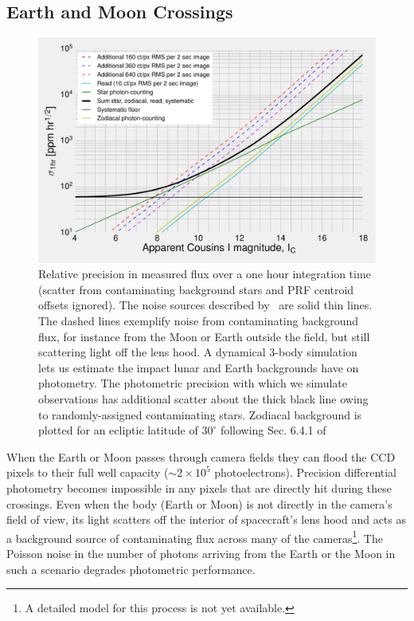 \subsection{Earth and Moon Crossings}
\label{sec:earth_moon_crossings}
\begin{figure}[!tb]
	\centering
	\includegraphics{figures/precision_memo.pdf}
	\caption{Relative precision in measured flux over a one hour integration time (scatter from contaminating background stars and PRF centroid offsets ignored). The noise sources described by~\protect\citet{Sullivan_2015} are solid thin lines. The dashed lines exemplify noise from contaminating background flux, for instance from the Moon or Earth outside the \tess field, but still scattering light off  the \tess lens hood. A dynamical 3-body simulation lets us estimate the impact  lunar and Earth backgrounds have on \tesss photometry.
	The photometric precision with which we simulate observations has additional scatter about the thick black line owing to randomly-assigned contaminating stars.
	Zodiacal background is plotted for an ecliptic latitude of $30^\circ$ following Sec. 6.4.1 of~\protect\citet{Sullivan_2015}}
	\label{fig:noise_with_moon}
\end{figure}

When the Earth or Moon passes through \tesss camera fields they can
flood the CCD pixels to their full well capacity ($\sim2\times10^5$
photoelectrons).  Precision differential photometry becomes impossible
in any pixels that are directly hit during these crossings.  Even when
the body (Earth or Moon) is not directly in the camera's field of
view, its light scatters off the interior of spacecraft's lens hood
and acts as a background source of contaminating flux across many of
the cameras\footnote{A detailed model for this process is not yet
  available.}.  
The Poisson noise in the number of photons
arriving from the Earth or the Moon in such a scenario degrades \tesss
photometric performance.   

